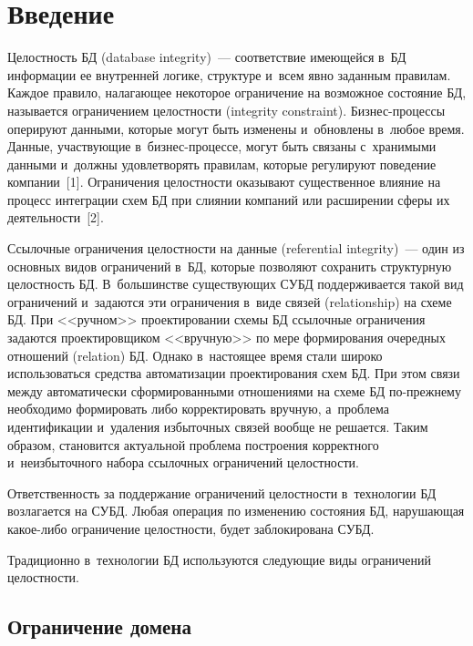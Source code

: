 \begin{multicols}{2}

\label{st\stat}

\section{Введение}

  Целостность БД (database integrity)~--- соответствие имеющейся
в~БД информации ее внутренней логике, структуре и~всем явно
заданным правилам. Каждое правило, налагающее некоторое ограничение на
возможное состояние БД, называется ограничением це\-лост\-ности
(integrity constraint). Биз\-нес-про\-цес\-сы оперируют данными, которые могут
быть изменены и~обновлены в~любое время. Данные, участвующие
  в~биз\-нес-про\-цессе, могут быть связаны с~хранимыми данными и~должны
удовлетворять правилам, которые регулируют поведение компании~[1].
Ограничения целостности оказывают существенное влияние на процесс
интеграции схем БД при слиянии компаний или расширении сферы их
деятельности~[2].

  Ссылочные ограничения целостности на данные (referential integrity)~--- один
из основных видов ограничений в~БД, которые позволяют
сохранить структурную целостность БД. В~большинстве существующих
СУБД поддерживается такой вид
ограничений и~задаются эти ограничения в~виде связей (relationship) на схеме
БД. При <<ручном>> проектировании схемы БД ссылочные ограничения
задаются проектировщиком <<вручную>> по мере формирования очередных
отношений (relation) БД. Однако в~настоящее время стали широко
использоваться средства автоматизации проектирования схем БД. При этом
связи между автоматически сформированными отношениями на схеме БД
  по-преж\-не\-му необходимо формировать либо корректировать вручную,
а~проблема идентификации и~удаления избыточных связей вообще не
решается. Таким образом, становится актуальной проблема построения
корректного и~неизбыточного набора ссылочных ограничений целостности.

  Ответственность за поддержание ограничений целостности в~технологии БД
возлагается на СУБД. Любая операция по изменению состояния БД,
нарушающая ка\-кое-ли\-бо ограничение целостности, будет заблокирована
СУБД.

  Традиционно в~технологии БД используются следующие виды ограничений
целостности.

\vspace*{-6pt}

\subsection{Ограничение домена}


\end{multicols}
